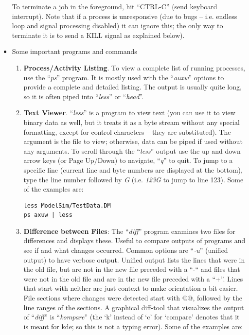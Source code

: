 \begin{itemize}
To terminate a job in the foreground, hit ``CTRL-C'' (send keyboard
interrupt). Note that if a process is unresponsive (due to bugs -- i.e.
endless loop and signal processing disabled) it can ignore this; the
only way to terminate it is to send a KILL signal as explained below).
\item
  Some important programs and commands
  \begin{enumerate}
  \item
    \textbf{Process/Activity Listing}. To view a complete list of
    running processes, use the ``\emph{ps}'' program. It is mostly used
    with the ``\emph{auxw}'' options to provide a complete and detailed
    listing. The output is usually quite long, so it is often piped into
    ``\emph{less}'' or ``\emph{head}''.
  \item
    \textbf{Text Viewer}. ``\emph{less}'' is a program to view text (you
    can use it to view binary data as well, but it treats it as a byte
    stream without any special formatting, except for control characters
    -- they are substituted). The argument is the file to view;
    otherwise, data can be piped if used without any arguments. To
    scroll through the ``\emph{less}'' output use the up and down arrow
    keys (or Page Up/Down) to navigate, ``\emph{q}'' to quit. To jump to
    a specific line (current line and byte numbers are displayed at the
    bottom), type the line number followed by \emph{G} (i.e. \emph{123G}
    to jump to line 123). Some of the examples are:
\begin{lstlisting}
less ModelSim/TestData.DM
ps axuw | less
\end{lstlisting}
\item
  \textbf{Difference between Files}: The ``\emph{diff}'' program
  examines two files for differences and displays these. Useful to
  compare outputs of programs and see if and what changes occurred.
  Common options are ``\emph{‑u}'' (unified output) to have verbose
  output. Unified output lists the lines that were in the old file, but
  are not in the new file preceded with a ``-`` and files that were not
  in the old file and are in the new file preceded with a ``+''. Lines
  that start with neither are just context to make orientation a bit
  easier. File sections where changes were detected start with @@,
  followed by the line ranges of the sections. A graphical diff-tool
  that visualizes the output of ``\emph{diff}'' is ``\emph{kompare}''
  (the `k' instead of `c' for `compare' denotes that it is meant for
  kde; so this is not a typing error). Some of the examples are:

\end{enumerate}
\end{itemize}
